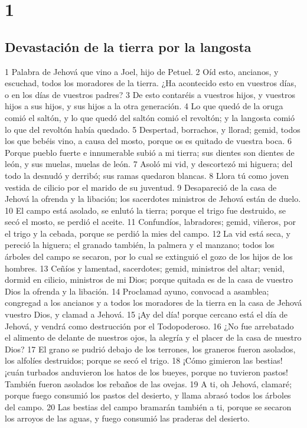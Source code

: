 
\chapter{1}

\section*{Devastación de la tierra por la langosta}

1 Palabra de Jehová que vino a Joel, hijo de Petuel.
2 Oíd esto, ancianos, y escuchad, todos los moradores de la tierra. ¿Ha acontecido esto en vuestros días, o en los días de vuestros padres?
3 De esto contaréis a vuestros hijos, y vuestros hijos a sus hijos, y sus hijos a la otra generación.
4 Lo que quedó de la oruga comió el saltón, y lo que quedó del saltón comió el revoltón; y la langosta comió lo que del revoltón había quedado.
5 Despertad, borrachos, y llorad; gemid, todos los que bebéis vino, a causa del mosto, porque os es quitado de vuestra boca.
6 Porque pueblo fuerte e innumerable subió a mi tierra; sus dientes son dientes de león, y sus muelas, muelas de león.
7 Asoló mi vid, y descortezó mi higuera; del todo la desnudó y derribó; sus ramas quedaron blancas.
8 Llora tú como joven vestida de cilicio por el marido de su juventud.
9 Desapareció de la casa de Jehová la ofrenda y la libación; los sacerdotes ministros de Jehová están de duelo.
10 El campo está asolado, se enlutó la tierra; porque el trigo fue destruido, se secó el mosto, se perdió el aceite.
11 Confundíos, labradores; gemid, viñeros, por el trigo y la cebada, porque se perdió la mies del campo.
12 La vid está seca, y pereció la higuera; el granado también, la palmera y el manzano; todos los árboles del campo se secaron, por lo cual se extinguió el gozo de los hijos de los hombres.
13 Ceñíos y lamentad, sacerdotes; gemid, ministros del altar; venid, dormid en cilicio, ministros de mi Dios; porque quitada es de la casa de vuestro Dios la ofrenda y la libación.
14 Proclamad ayuno, convocad a asamblea; congregad a los ancianos y a todos los moradores de la tierra en la casa de Jehová vuestro Dios, y clamad a Jehová.
15 ¡Ay del día! porque cercano está el día de Jehová, y vendrá como destrucción por el Todopoderoso. 
16 ¿No fue arrebatado el alimento de delante de nuestros ojos, la alegría y el placer de la casa de nuestro Dios?
17 El grano se pudrió debajo de los terrones, los graneros fueron asolados, los alfolíes destruidos; porque se secó el trigo.
18 ¡Cómo gimieron las bestias! ¡cuán turbados anduvieron los hatos de los bueyes, porque no tuvieron pastos! También fueron asolados los rebaños de las ovejas.
19 A ti, oh Jehová, clamaré; porque fuego consumió los pastos del desierto, y llama abrasó todos los árboles del campo.
20 Las bestias del campo bramarán también a ti, porque se secaron los arroyos de las aguas, y fuego consumió las praderas del desierto.

